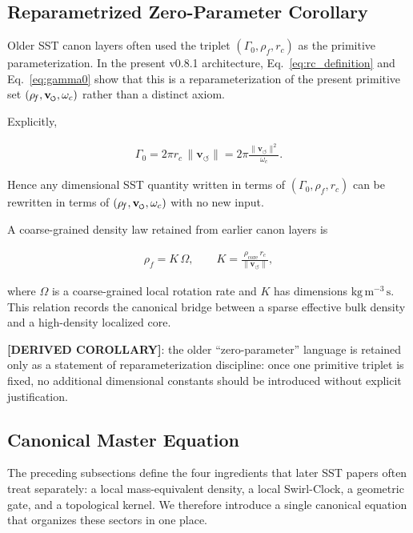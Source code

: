 \documentclass[11pt]{article}
\theoremstyle{definition}
\theoremstyle{plain}
\theoremstyle{remark}
\newcommand{\swirlarrow}{\mathchoice{\mkern-2mu\scriptstyle\boldsymbol{\circlearrowleft}}{\mkern-2mu\scriptstyle\boldsymbol{\circlearrowleft}}{\mkern-2mu\scriptscriptstyle\boldsymbol{\circlearrowleft}}{\mkern-2mu\scriptscriptstyle\boldsymbol{\circlearrowleft}}}
\newcommand{\vswirl}{\mathbf{v}_{\swirlarrow}}
\newcommand{\rhoF}{{\rho_{\!f}}}
\newcommand{\rhocore}{\rho_{\mathrm{core}}}
\newcommand{\rc}{{r_c}}
\newcommand{\vnorm}{\lVert \mathbf{v}_{\!\boldsymbol{\circlearrowleft}} \rVert}
\begin{document}
    \subsection{Reparametrized Zero-Parameter Corollary}
        \label{subsec:zero_parameter_corollary}

        Older SST canon layers often used the triplet $(\Gamma_0,\rhoF,\rc)$ as the primitive parameterization. In the present v0.8.1 architecture, Eq.~\eqref{eq:rc_definition} and Eq.~\eqref{eq:gamma0} show that this is a reparameterization of the present primitive set $(\rhoF,\vswirl,\omega_c)$ rather than a distinct axiom.

        Explicitly,

        \begin{align}
            \Gamma_0 = 2\pi \rc \, \vnorm
            = 2\pi \frac{\vnorm^2}{\omega_c}.
            \label{eq:gamma0_reparam}
        \end{align}

        Hence any dimensional SST quantity written in terms of $(\Gamma_0,\rhoF,\rc)$ can be rewritten in terms of $(\rhoF,\vswirl,\omega_c)$ with no new input.

        A coarse-grained density law retained from earlier canon layers is

        \begin{align}
            \rhoF = K\,\Omega,
            \qquad
            K = \frac{\rhocore \, \rc}{\vnorm},
            \label{eq:coarse_grain_density}
        \end{align}

        where $\Omega$ is a coarse-grained local rotation rate and $K$ has dimensions $\mathrm{kg\,m^{-3}\,s}$. This relation records the canonical bridge between a sparse effective bulk density and a high-density localized core.

        \textbf{[DERIVED COROLLARY]}: the older ``zero-parameter'' language is retained only as a statement of reparameterization discipline: once one primitive triplet is fixed, no additional dimensional constants should be introduced without explicit justification.

    \subsection{Canonical Master Equation}
    \label{sec:master-equation}

        The preceding subsections define the four ingredients that later SST papers often treat separately:
        a local mass-equivalent density, a local Swirl-Clock, a geometric gate, and a topological kernel.
        We therefore introduce a single canonical equation that organizes these sectors in one place.
\end{document}
